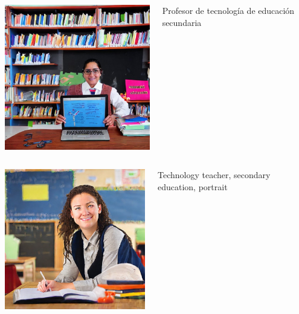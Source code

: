 \documentclass[17pt,aspectratio=169,hyperref={pdfusetitle,colorlinks,allcolors=olive}]{beamer}
\begin{document}
\begin{frame}[fragile]

    \begin{columns}[T]
    \begin{column}{.58\textwidth}
        \includegraphics[width=7.5cm]{figs/sd-profe-secundaria}
    \end{column}%
    \hfill%
    \begin{column}{.38\textwidth}
      Profesor de tecnología de educación secundaria
    \end{column}%
  \end{columns}

\end{frame}

\begin{frame}[fragile]

    \begin{columns}[T]
    \begin{column}{.58\textwidth}
        \includegraphics[width=7.5cm]{figs/sd-teacher-tech}
    \end{column}%
    \hfill%
    \begin{column}{.38\textwidth}
      Technology teacher, secondary education, portrait
    \end{column}%
  \end{columns}

\end{frame}
\end{document}
